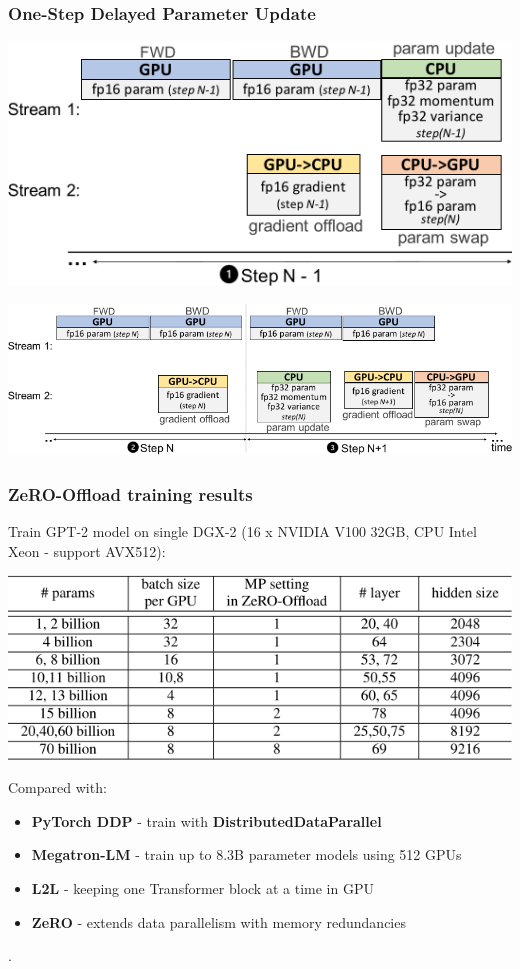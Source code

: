 \documentclass{beamer}
\begin{document}
\begin{frame}
    \frametitle{One-Step Delayed Parameter Update}
    \begin{center}
        \includegraphics[scale=1.45]{img/delayed_parameter_update_1.png}
    \end{center}
    \begin{center}
        \includegraphics[scale=1.45]{img/delayed_parameter_update_2.png}
    \end{center}
\end{frame}

\begin{frame}
    \frametitle{ZeRO-Offload training results}
    \footnotesize{Train GPT-2 model on single DGX-2 (16 x NVIDIA V100 32GB, CPU Intel Xeon - support AVX512)}:
    \begin{center}
        \includegraphics[scale=1.6]{img/zero_offload_gpt2_size.png}
    \end{center}
    \footnotesize{Compared with:}
    \begin{itemize}
        \item \footnotesize{\textbf{PyTorch DDP} - train with} \textbf{DistributedDataParallel}
        \item \footnotesize{\textbf{Megatron-LM} - train up to 8.3B parameter models using 512 GPUs}
        \item \footnotesize{\textbf{L2L} - keeping one Transformer block at a time in GPU}
        \item \footnotesize{\textbf{ZeRO} - extends data parallelism with memory redundancies}
    \end{itemize}
    .
\end{frame}
\end{document}
